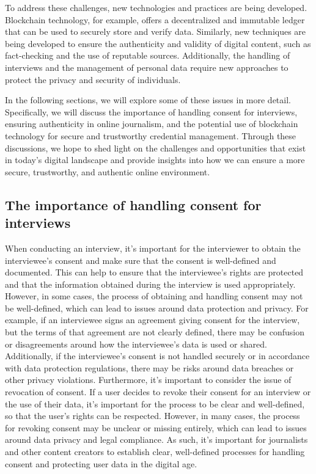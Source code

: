 \documentclass[target=mst,aauheader=]{thud}
\begin{document}
To address these challenges, new technologies and practices are being developed. Blockchain technology, for example, offers a decentralized and immutable ledger that can be used to securely store and verify data. Similarly, new techniques are being developed to ensure the authenticity and validity of digital content, such as fact-checking and the use of reputable sources. Additionally, the handling of interviews and the management of personal data require new approaches to protect the privacy and security of individuals.\par
In the following sections, we will explore some of these issues in more detail. Specifically, we will discuss the importance of handling consent for interviews, ensuring authenticity in online journalism, and the potential use of blockchain technology for secure and trustworthy credential management. Through these discussions, we hope to shed light on the challenges and opportunities that exist in today's digital landscape and provide insights into how we can ensure a more secure, trustworthy, and authentic online environment.

\subsection{The importance of handling consent for interviews}

When conducting an interview, it's important for the interviewer to obtain the interviewee's consent and make sure that the consent is well-defined and documented. This can help to ensure that the interviewee's rights are protected and that the information obtained during the interview is used appropriately. However, in some cases, the process of obtaining and handling consent may not be well-defined, which can lead to issues around data protection and privacy. For example, if an interviewee signs an agreement giving consent for the interview, but the terms of that agreement are not clearly defined, there may be confusion or disagreements around how the interviewee's data is used or shared. Additionally, if the interviewee's consent is not handled securely or in accordance with data protection regulations, there may be risks around data breaches or other privacy violations. Furthermore, it's important to consider the issue of revocation of consent.
If a user decides to revoke their consent for an interview or the use of their data, it's important for the process to be clear and well-defined, so that the user's rights can be respected. However, in many cases, the process for revoking consent may be unclear or missing entirely, which can lead to issues around data privacy and legal compliance. As such, it's important for journalists and other content creators to establish clear, well-defined processes for handling consent and protecting user data in the digital age.\par
\end{document}

